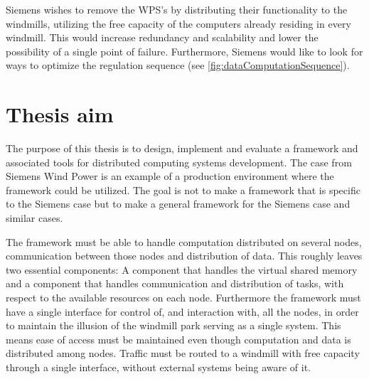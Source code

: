 Siemens wishes to remove the WPS's by distributing their functionality to the windmills, utilizing the free capacity of the computers already residing in every windmill. This would increase redundancy and scalability and lower the possibility of a single point of failure. Furthermore, Siemens would like to look for ways to optimize the regulation sequence (see \cref{fig:dataComputationSequence}).





\section{Thesis aim}

The purpose of this thesis is to design, implement and evaluate a framework and associated tools for distributed computing systems development. The case from Siemens Wind Power is an example of a production environment where the framework could be utilized. The goal is not to make a framework that is specific to the Siemens case but to make a general framework for the Siemens case and similar cases. 

The framework must be able to handle computation distributed on several nodes, communication between those nodes and distribution of data. This roughly leaves two essential components: A component that handles the virtual shared memory and a component that handles communication and distribution of tasks, with respect to the available resources on each node. Furthermore the framework must have a single interface for control of, and interaction with, all the nodes, in order to maintain the illusion of the windmill park serving as a single system. This means ease of access must be maintained even though computation and data is distributed among nodes. Traffic must be routed to a windmill with free capacity through a single interface, without external systems being aware of it.

